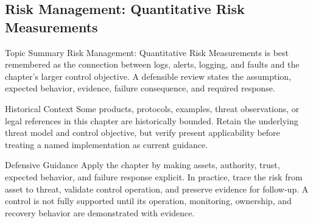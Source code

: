 \documentclass[11pt,letterpaper]{article}
\begin{document}
\subsection*{Risk Management: Quantitative Risk Measurements}
\begin{CornellNotesTable}
\end{CornellNotesTable}
\begin{CornellSummaryBox}{Topic Summary}
Risk Management: Quantitative Risk Measurements is best remembered as the connection between logs, alerts, logging, and faults and the chapter's larger control objective. A defensible review states the assumption, expected behavior, evidence, failure consequence, and required response.
\end{CornellSummaryBox}
\begin{CornellWarningBox}{Historical Context}
Some products, protocols, examples, threat observations, or legal references in this chapter are historically bounded. Retain the underlying threat model and control objective, but verify present applicability before treating a named implementation as current guidance.
\end{CornellWarningBox}
\begin{CornellOverviewBox}{Defensive Guidance}
Apply the chapter by making assets, authority, trust, expected behavior, and failure response explicit. In practice, trace the risk from asset to threat, validate control operation, and preserve evidence for follow-up. A control is not fully supported until its operation, monitoring, ownership, and recovery behavior are demonstrated with evidence.
\end{CornellOverviewBox}
\end{document}
